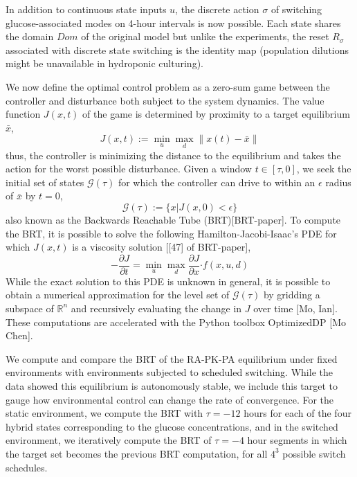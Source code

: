 \documentclass[twocolumn, 10pt]{report}
\begin{document}
{\noindent In addition to continuous state inputs $u$, the discrete action $\sigma$ of switching glucose-associated modes on 4-hour intervals is now possible. Each state shares the domain $Dom$ of the original model but unlike the experiments, the reset $R_\sigma$ associated with discrete state switching is the identity map (population dilutions might be unavailable in hydroponic culturing). 

We now define the optimal control problem as a zero-sum game between the controller and disturbance both subject to the system dynamics. The value function $J(x,t)$ of the game is determined by proximity to a target equilibrium $\bar{x}$,
\begin{equation}\label{Value}
    J(x,t) := \min_{u} \max_{d} \left\lVert x(t) - \bar{x} 
    \right\rVert
\end{equation}
\noindent thus, the controller is minimizing the distance to the equilibrium and takes the action for the worst possible disturbance. Given a window $t \in [\tau, 0]$, we seek the initial set of states $\mathcal{G}(\tau)$ for which the controller can drive to within an $\epsilon$ radius of $\bar{x}$ by $t=0$, 
\begin{equation}\label{BRT}
    \mathcal{G}(\tau) := \{ x | J(x, 0) < \epsilon \}
\end{equation}
\noindent also known as the Backwards Reachable Tube (BRT)[BRT-paper]. To compute the BRT, it is possible to solve the following Hamilton-Jacobi-Isaac's PDE for which $J(x,t)$ is a viscosity solution [[47] of BRT-paper],
\begin{equation}\label{HJI}
    -\frac{\partial J}{\partial t} = \min_{u} \max_{d} \frac{\partial J}{\partial x} \boldsymbol{\cdot} f(x, u, d)
\end{equation}
\noindent While the exact solution to this PDE is unknown in general, it is possible to obtain a numerical approximation for the level set of $\mathcal{G}(\tau)$ by gridding a subspace of $\mathbb{R}^n$ and recursively evaluating the change in $J$ over time [Mo, Ian]. These computations are accelerated with the Python toolbox OptimizedDP [Mo Chen].

We compute and compare the BRT of the RA-PK-PA equilibrium under fixed environments with environments subjected to scheduled switching. While the data showed this equilibrium is autonomously stable, we include this target to gauge how environmental control can change the rate of convergence. For the static environment, we compute the BRT with $\tau = -12$ hours for each of the four hybrid states corresponding to the glucose concentrations, and in the switched environment, we iteratively compute the BRT of $\tau = -4$ hour segments in which the target set becomes the previous BRT computation, for all $4^3$ possible switch schedules. 

}
\end{document}

